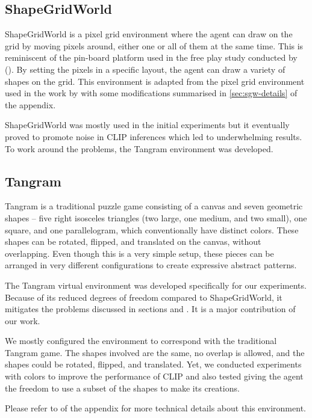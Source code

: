 \subsection{ShapeGridWorld}
\label{sec:sgw}
ShapeGridWorld is a pixel grid environment where the agent can draw on the grid by moving pixels around, either one or all of them at the same time.
This is reminiscent of the pin-board platform used in the free play study conducted by \citet{diggs} ().
By setting the pixels in a specific layout, the agent can draw a variety of shapes on the grid.
This environment is adapted from the pixel grid environment used in the work by \citet{rair} with some modifications summarised in \ref{sec:sgw-details} of the appendix.

ShapeGridWorld was mostly used in the initial experiments but it eventually proved to promote noise in CLIP inferences which led to underwhelming results.
To work around the problems, the Tangram environment was developed.

\subsection{Tangram}
\label{sec:tangram}
Tangram is a traditional puzzle game consisting of a canvas and seven geometric shapes -- five right isosceles triangles (two large, one medium, and two small), one square, and one parallelogram, which conventionally have distinct colors.
These shapes can be rotated, flipped, and translated on the canvas, without overlapping.
Even though this is a very simple setup, these pieces can be arranged in very different configurations to create expressive abstract patterns.

The Tangram virtual environment was developed specifically for our experiments.
Because of its reduced degrees of freedom compared to ShapeGridWorld, it mitigates the problems discussed in sections  and .
It is a major contribution of our work.

We mostly configured the environment to correspond with the traditional Tangram game.
The shapes involved are the same, no overlap is allowed, and the shapes could be rotated, flipped, and translated.
Yet, we conducted experiments with colors to improve the performance of CLIP and also tested giving the agent the freedom to use a subset of the shapes to make its creations.

Please refer to  of the appendix for more technical details about this environment.
